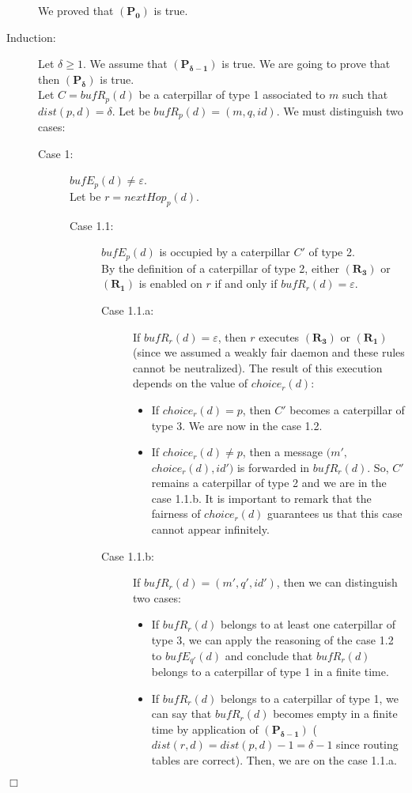 \documentclass[11pt]{article}
\newenvironment{proof}{{\noindent\bf Proof. } }{{\hfill $\Box$}}
\begin{document}
\begin{proof}
\begin{description}
We proved that $\boldsymbol{(P_{0})}$ is true.

\item [Induction:] Let $\delta\geq1$. We assume that $\boldsymbol{(P_{\delta-1})}$ is true. We are going to prove that then $\boldsymbol{(P_{\delta})}$ is true.\\
Let $C=bufR_{p}(d)$ be a caterpillar of type 1 associated to $m$ such that $dist(p,d)=\delta$. Let be $bufR_{p}(d)=(m,q,id)$. We must distinguish two cases:

\begin{description}
\item [Case 1:] $bufE_{p}(d)\neq \varepsilon$.\\
Let be $r=nextHop_{p}(d)$.

\begin{description}
\item [Case 1.1:] $bufE_{p}(d)$ is occupied by a caterpillar $C'$ of type 2.\\
By the definition of a caterpillar of type 2, either $\boldsymbol{(R_{3})}$ or $\boldsymbol{(R_{1})}$ is enabled on $r$ if and only if $bufR_{r}(d)=\varepsilon$.

\begin{description}
\item [Case 1.1.a:] If $bufR_{r}(d)=\varepsilon$, then $r$ executes $\boldsymbol{(R_{3})}$ or $\boldsymbol{(R_{1})}$ (since we assumed a weakly fair daemon and these rules cannot be neutralized). The result of this execution depends on the value of $choice_{r}(d)$:

\begin{itemize}
\item If $choice_{r}(d)=p$, then $C'$ becomes a caterpillar of type 3. We are now in the case 1.2. 
\item If $choice_{r}(d)\neq p$, then a message $(m',$ $choice_{r}(d),id')$ is forwarded in $bufR_{r}(d)$. So, $C'$ remains a caterpillar of type 2 and we are in the case 1.1.b. It is important to remark that the fairness of $choice_{r}(d)$ guarantees us that this case cannot appear infinitely. 
\end{itemize}

\item [Case 1.1.b:] If $bufR_{r}(d)=(m',q',id')$, then we can distinguish two cases:

\begin{itemize}
\item If $bufR_{r}(d)$ belongs to at least one caterpillar of type 3, we can apply the reasoning of the case 1.2 to $bufE_{q'}(d)$ and conclude that $bufR_{r}(d)$ belongs to a caterpillar of type 1 in a finite time. 
\item If $bufR_{r}(d)$ belongs to a caterpillar of type 1, we can say that $bufR_{r}(d)$ becomes empty in a finite time by application of $\boldsymbol{(P_{\delta-1})}$ ($dist(r,d)=dist(p,d)-1=\delta-1$ since routing tables are correct). Then, we are on the case 1.1.a. 
\end{itemize}


\end{description}
\end{description}
\end{description}
\end{description}
\end{proof}
\end{document}
